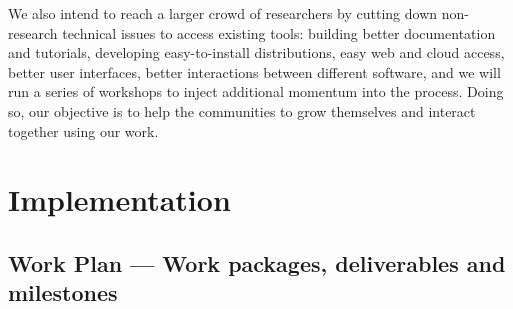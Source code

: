 \documentclass[noworkareas,deliverables,keys]{euproposal}                  %
\begin{document}
\begin{proposal}
We also intend to reach a larger crowd of researchers by cutting down
non-research technical issues to access existing tools: building
better documentation and tutorials, developing easy-to-install
distributions, easy web and cloud access, better user interfaces,
better interactions between different software, and we will run a
series of workshops to inject additional momentum into the
process. Doing so, our objective is to help the communities to grow
themselves and interact together using our work.


\clearpage

\draftpage


\draftpage


\draftpage


\draftpage


\clearpage


\section{Implementation}


\subsection{Work Plan --- Work packages, deliverables and milestones}
\label{sect:workplan}


\end{proposal}
\end{document}
